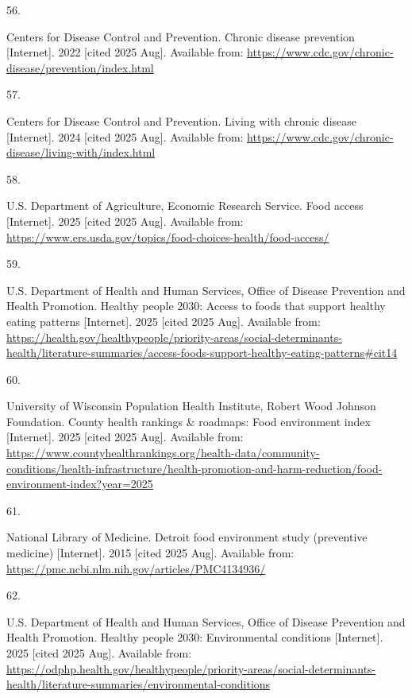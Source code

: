 \documentclass[
  english,
  letterpaper,
]{report}
\newlength{\cslhangindent}
\newlength{\csllabelwidth}
\newenvironment{CSLReferences}[2] %
 {\begin{list}{}{%
  \setlength{\itemindent}{0pt}
  \setlength{\leftmargin}{0pt}
  \setlength{\parsep}{0pt}
  \ifodd #1
   \setlength{\leftmargin}{\cslhangindent}
   \setlength{\itemindent}{-1\cslhangindent}
  \fi
  \setlength{\itemsep}{#2\baselineskip}}}
 {\end{list}}
\newcommand{\CSLLeftMargin}[1]{\parbox[t]{\csllabelwidth}{\strut#1\strut}}
\newcommand{\CSLRightInline}[1]{\parbox[t]{\linewidth - \csllabelwidth}{\strut#1\strut}}
\begin{document}
\begin{CSLReferences}{0}{1}
\CSLLeftMargin{56. }%
\CSLRightInline{Centers for Disease Control and Prevention. Chronic
disease prevention {[}Internet{]}. 2022 {[}cited 2025 Aug{]}. Available
from: \url{https://www.cdc.gov/chronic-disease/prevention/index.html}}

\CSLLeftMargin{57. }%
\CSLRightInline{Centers for Disease Control and Prevention. Living with
chronic disease {[}Internet{]}. 2024 {[}cited 2025 Aug{]}. Available
from: \url{https://www.cdc.gov/chronic-disease/living-with/index.html}}

\CSLLeftMargin{58. }%
\CSLRightInline{U.S. Department of Agriculture, Economic Research
Service. Food access {[}Internet{]}. 2025 {[}cited 2025 Aug{]}.
Available from:
\url{https://www.ers.usda.gov/topics/food-choices-health/food-access/}}

\CSLLeftMargin{59. }%
\CSLRightInline{U.S. Department of Health and Human Services, Office of
Disease Prevention and Health Promotion. Healthy people 2030: Access to
foods that support healthy eating patterns {[}Internet{]}. 2025 {[}cited
2025 Aug{]}. Available from:
\url{https://health.gov/healthypeople/priority-areas/social-determinants-health/literature-summaries/access-foods-support-healthy-eating-patterns\#cit14}}

\CSLLeftMargin{60. }%
\CSLRightInline{University of Wisconsin Population Health Institute,
Robert Wood Johnson Foundation. County health rankings \& roadmaps: Food
environment index {[}Internet{]}. 2025 {[}cited 2025 Aug{]}. Available
from:
\url{https://www.countyhealthrankings.org/health-data/community-conditions/health-infrastructure/health-promotion-and-harm-reduction/food-environment-index?year=2025}}

\CSLLeftMargin{61. }%
\CSLRightInline{National Library of Medicine. Detroit food environment
study (preventive medicine) {[}Internet{]}. 2015 {[}cited 2025 Aug{]}.
Available from: \url{https://pmc.ncbi.nlm.nih.gov/articles/PMC4134936/}}

\CSLLeftMargin{62. }%
\CSLRightInline{U.S. Department of Health and Human Services, Office of
Disease Prevention and Health Promotion. Healthy people 2030:
Environmental conditions {[}Internet{]}. 2025 {[}cited 2025 Aug{]}.
Available from:
\url{https://odphp.health.gov/healthypeople/priority-areas/social-determinants-health/literature-summaries/environmental-conditions}}


\end{CSLReferences}
\end{document}
